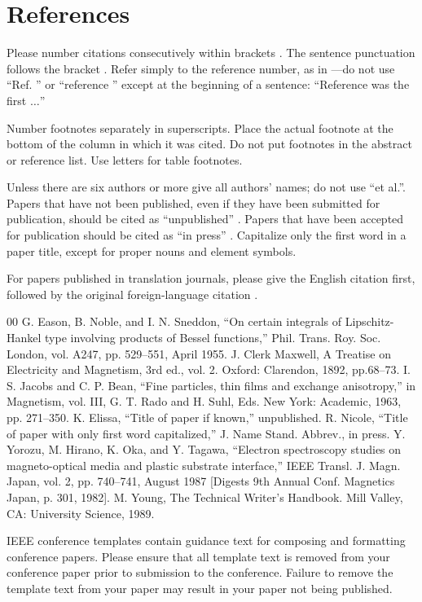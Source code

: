 \documentclass[conference]{IEEEtran}
\begin{document}
\section*{References}

Please number citations consecutively within brackets \cite{b1}. The 
sentence punctuation follows the bracket \cite{b2}. Refer simply to the reference 
number, as in \cite{b3}---do not use ``Ref. \cite{b3}'' or ``reference \cite{b3}'' except at 
the beginning of a sentence: ``Reference \cite{b3} was the first $\ldots$''

Number footnotes separately in superscripts. Place the actual footnote at 
the bottom of the column in which it was cited. Do not put footnotes in the 
abstract or reference list. Use letters for table footnotes.

Unless there are six authors or more give all authors' names; do not use 
``et al.''. Papers that have not been published, even if they have been 
submitted for publication, should be cited as ``unpublished'' \cite{b4}. Papers 
that have been accepted for publication should be cited as ``in press'' \cite{b5}. 
Capitalize only the first word in a paper title, except for proper nouns and 
element symbols.

For papers published in translation journals, please give the English 
citation first, followed by the original foreign-language citation \cite{b6}.

\begin{thebibliography}{00}
 G. Eason, B. Noble, and I. N. Sneddon, ``On certain integrals of Lipschitz-Hankel type involving products of Bessel functions,'' Phil. Trans. Roy. Soc. London, vol. A247, pp. 529--551, April 1955.
 J. Clerk Maxwell, A Treatise on Electricity and Magnetism, 3rd ed., vol. 2. Oxford: Clarendon, 1892, pp.68--73.
 I. S. Jacobs and C. P. Bean, ``Fine particles, thin films and exchange anisotropy,'' in Magnetism, vol. III, G. T. Rado and H. Suhl, Eds. New York: Academic, 1963, pp. 271--350.
 K. Elissa, ``Title of paper if known,'' unpublished.
 R. Nicole, ``Title of paper with only first word capitalized,'' J. Name Stand. Abbrev., in press.
 Y. Yorozu, M. Hirano, K. Oka, and Y. Tagawa, ``Electron spectroscopy studies on magneto-optical media and plastic substrate interface,'' IEEE Transl. J. Magn. Japan, vol. 2, pp. 740--741, August 1987 [Digests 9th Annual Conf. Magnetics Japan, p. 301, 1982].
 M. Young, The Technical Writer's Handbook. Mill Valley, CA: University Science, 1989.
\end{thebibliography}
\vspace{12pt}
\color{red}
IEEE conference templates contain guidance text for composing and formatting conference papers. Please ensure that all template text is removed from your conference paper prior to submission to the conference. Failure to remove the template text from your paper may result in your paper not being published.


\end{document}
